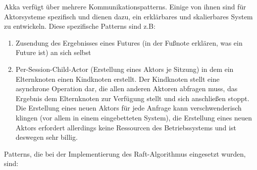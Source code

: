 Akka verfügt über mehrere Kommunikationspatterns. Einige von ihnen sind für Aktorsysteme spezifisch und dienen dazu, ein erklärbares und skalierbares System zu entwickeln. Diese spezifische Patterns sind z.B:

\begin{enumerate}
	\item Zusendung des Ergebnisses eines Futures (in der Fußnote erklären, was ein Future ist) an sich selbst
	
	\item Per-Session-Child-Actor (Erstellung eines Aktors je Sitzung) in dem ein Elternknoten einen Kindknoten erstellt. Der Kindknoten stellt eine asynchrone Operation dar, die allen anderen Aktoren abfragen muss, das Ergebnis dem Elternknoten zur Verfügung stellt und sich anschließen stoppt. Die Erstellung eines neuen Aktors für jede Anfrage kann verschwenderisch klingen (vor allem in einem eingebetteten System), die Erstellung eines neuen Aktors erfordert allerdings keine Ressourcen des Betriebssystems und ist deswegen sehr billig.
\end{enumerate}

Patterns, die bei der Implementierung des Raft-Algorithmus eingesetzt wurden, sind:

